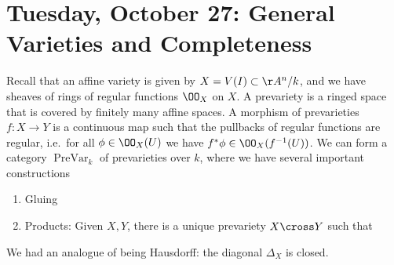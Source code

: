 \hypertarget{tuesday-october-27-general-varieties-and-completeness}{%
\section{Tuesday, October 27: General Varieties and
Completeness}\label{tuesday-october-27-general-varieties-and-completeness}}

Recall that an affine variety is given by \(X = V(I) \subset \AA^n/k\),
and we have sheaves of rings of regular functions \(\OO_X\) on \(X\). A
prevariety is a ringed space that is covered by finitely many affine
spaces. A morphism of prevarieties \(f:X\to Y\) is a continuous map such
that the pullbacks of regular functions are regular, i.e.~for all
\(\phi \in \OO_X(U)\) we have \(f^* \phi \in \OO_X(f^{-1} (U) )\). We
can form a category \(\operatorname{PreVar}_k\) of prevarieties over
\(k\), where we have several important constructions

\begin{enumerate}
\def\labelenumi{\arabic{enumi}.}
\item
  Gluing
\item
  Products: Given \(X, Y\), there is a unique prevariety \(X\cross Y\)
  such that

  \begin{center}
  \end{center}
\end{enumerate}

We had an analogue of being Hausdorff: the diagonal \(\Delta_X\) is
closed.

